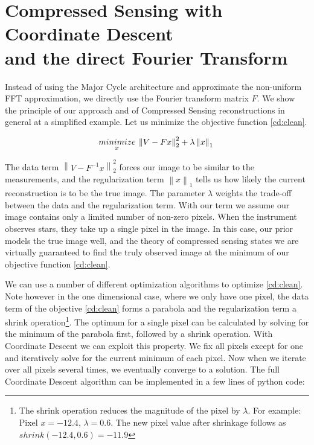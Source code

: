 \section{Compressed Sensing with Coordinate Descent\\ and the direct Fourier Transform}\label{cd}
Instead of using the Major Cycle architecture and approximate the non-uniform FFT approximation, we directly use the Fourier transform matrix $F$. We show the principle of our approach and of Compressed Sensing reconstructions in general at a simplified example. Let us minimize the objective function \eqref{cd:clean}.

\begin{equation}\label{cd:clean}
\underset{x}{minimize} \: \left \| V - Fx \right \|_2^2 + \lambda \left \| x \right \|_1 \\
\end{equation}

The data term $\left \| V - F^{-1}x \right \|_2^2$ forces our image to be similar to the measurements, and the regularization term $\left \| x \right \|_1$ tells us how likely the current reconstruction is to be the true image. The parameter $\lambda$ weights the trade-off between the data and the regularization term. With our term we assume our image contains only a limited number of non-zero pixels.  When the instrument observes stars, they take up a single pixel in the image. In this case, our prior models the true image well, and the theory of compressed sensing states we are virtually guaranteed to find the truly observed image at the minimum of our objective function \eqref{cd:clean}.

We can use a number of different optimization algorithms to optimize \eqref{cd:clean}. Note however in the one dimensional case, where we only have one pixel, the data term of the objective \eqref{cd:clean} forms a parabola and the regularization term a shrink operation\footnote{The shrink operation reduces the magnitude of the pixel by $\lambda$. For example: Pixel $x = -12.4$, $\lambda = 0.6$. The new pixel value after shrinkage follows as $shrink(-12.4, 0.6) = -11.9$}. The optimum for a single pixel can be calculated by solving for the minimum of the parabola first, followed by a shrink operation. With Coordinate Descent we can exploit this property. We fix all pixels except for one and iteratively solve for the current minimum of each pixel. Now when we iterate over all pixels several times, we eventually converge to a solution. The full Coordinate Descent algorithm can be implemented in a few lines of python code:

